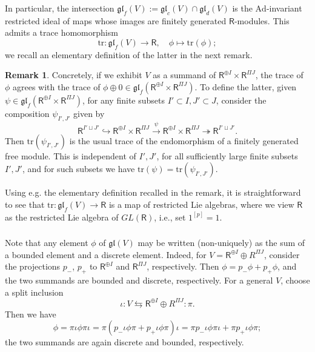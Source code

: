 \documentclass{amsart}
\theoremstyle{definition}
\newtheorem{Rem}[Thm]{Remark}
\newcommand{\gl}{\mathfrak{gl}}
\newcommand{\sss}{\subsubsection{}}
\newcommand{\on}{\mathrm}
\newcommand{\Ring}{\mathsf{R}}
\numberwithin{equation}{section}
\begin{document}
In particular, the intersection $\gl_f(V) := \gl_c(V) \cap \gl_d(V)$ is the $\on{Ad}$-invariant restricted ideal of maps whose images are finitely generated $\Ring$-modules. This admits a trace homomorphism 
$$\on{tr}: \gl_f(V) \rightarrow \Ring, \quad \phi \mapsto \on{tr}(\phi);$$
{we recall an elementary definition of the latter in the next remark.}

\begin{Rem} Concretely, if we exhibit $V$ as a summand of $\Ring^{\oplus I} \times \Ring^{\Pi J}$, the trace of $\phi$ agrees with the trace of $\phi \oplus 0 \in \gl_f(\Ring^{\oplus I} \times \Ring^{\Pi J}).$ {To define} the latter, given $\psi \in \gl_f(\Ring^{\oplus I} \times \Ring^{\Pi J})$, for any finite subsets $I' \subset I, J' \subset J$, consider the composition $\psi_{I', J'}$ given by
$$\Ring^{I' \sqcup J'} \hookrightarrow \Ring^{\oplus I} \times \Ring^{\Pi J} \xrightarrow{\psi} \Ring^{\oplus I} \times \Ring^{\Pi J} \twoheadrightarrow \Ring^{I' \sqcup J'}.$$
Then $\on{tr}(\psi_{I', J'})$ is the usual trace of the endomorphism of a finitely generated {free} module. This is independent of $I', J'$, for all sufficiently large finite subsets $I', J'$, and for such subsets we have $\on{tr}(\psi) = \on{tr}(\psi_{I', J'})$. \end{Rem}

Using e.g. the elementary definition recalled in the remark, it is straightforward to see that $\on{tr}: \gl_f(V) \rightarrow \Ring$ is a map of restricted Lie algebras, where we view $\Ring$ as the restricted Lie algebra of $GL(\Ring)$, i.e., set $1^{[p]} = 1.$


\sss \label{sss:humgum}
 Note that any element $\phi$ of $\gl(V)$ may be written (non-uniquely) as the sum of a bounded element and a discrete element. Indeed, for $V = \Ring^{\oplus I} \oplus R^{\Pi J}$, consider the projections $p_-$, $p_+$ to $\Ring^{\oplus I}$ and $\Ring^{\Pi J}$, respectively. Then $\phi =  p_- \phi + p_+  \phi$, and the two summands are bounded and discrete, respectively. For a general $V$, choose a split inclusion $$\iota: V \leftrightarrows \Ring^{\oplus I} \oplus R^{\Pi J}: \pi.$$Then we have $$\phi =        \pi  \iota  \phi  \pi   \iota = \pi  (p_-\iota\phi \pi + p_+ \iota\phi \pi)\iota = \pi p_-\iota\phi\pi \iota + \pi p_+ \iota \phi \pi;$$the two summands are again discrete and bounded, respectively. 
 
\end{document}

